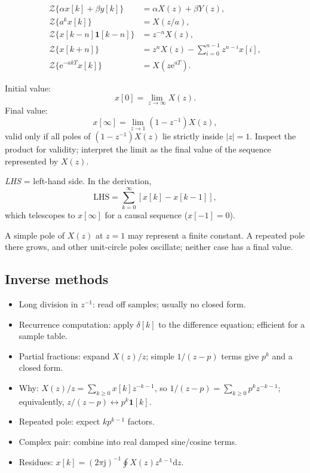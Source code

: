 \documentclass[10pt]{article}
\newcommand{\Z}{\mathcal{Z}}
\newcommand{\e}{\mathrm{e}}
\newcommand{\unitstep}{\mathbf{1}}
\newcommand{\weeklabel}[1]{\par\smallskip\noindent{\color{blue!60!black}\textbf{#1}}\par\smallskip}
\begin{document}
\begin{align*}
\Z\{\alpha x[k]+\beta y[k]\}&=\alpha X(z)+\beta Y(z),\\
\Z\{a^kx[k]\}&=X(z/a),\\
\Z\{x[k-n]\unitstep[k-n]\}&=z^{-n}X(z),\\
\Z\{x[k+n]\}&=z^nX(z)-\sum_{i=0}^{n-1}z^{n-i}x[i],\\
\Z\{\e^{-akT}x[k]\}&=X(z\e^{aT}).
\end{align*}

Initial value:
\[
x[0]=\lim_{z\to\infty}X(z).
\]
Final value:
\[
x[\infty]=\lim_{z\to1}(1-z^{-1})X(z),
\]
valid only if all poles of $(1-z^{-1})X(z)$ lie strictly inside $|z|=1$.
Inspect the product for validity; interpret the limit as the final value of the sequence represented by $X(z)$.

\emph{LHS} = left-hand side. In the derivation,
\[
\mathrm{LHS}=\sum_{k=0}^{\infty}[x[k]-x[k-1]],
\]
which telescopes to $x[\infty]$ for a causal sequence ($x[-1]=0$).

A simple pole of $X(z)$ at $z=1$ may represent a finite constant. A repeated pole there grows, and other unit-circle poles oscillate; neither case has a final value.

\subsection{Inverse methods}

\weeklabel{Week 2 begins}

\begin{itemize}
  \item Long division in $z^{-1}$: read off samples; usually no closed form.
  \item Recurrence computation: apply $\delta[k]$ to the difference equation; efficient for a sample table.
  \item Partial fractions: expand $X(z)/z$; simple $1/(z-p)$ terms give $p^k$ and a closed form.
  \item Why: $X(z)/z=\sum_{k\ge0}x[k]z^{-k-1}$, so $1/(z-p)=\sum_{k\ge0}p^kz^{-k-1}$; equivalently, $z/(z-p)\leftrightarrow p^k\unitstep[k]$.
  \item Repeated pole: expect $k p^{k-1}$ factors.
  \item Complex pair: combine into real damped sine/cosine terms.
  \item Residues: $x[k]=(2\pi\mathrm{j})^{-1}\oint X(z)z^{k-1}\mathrm{d}z$.
\end{itemize}
\end{document}
